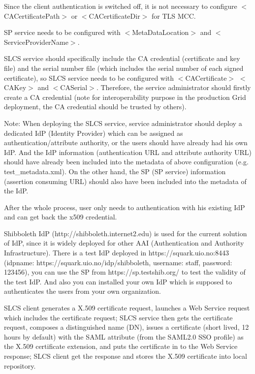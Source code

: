 \documentclass{article}                            %
\begin{document}
    Since the client authentication is switched off, it is not necessary to configure $<$CACertificatePath$>$ or $<$CACertificateDir$>$ for TLS MCC.

    SP service needs to be configured with $<$MetaDataLocation$>$ and $<$ServiceProviderName$>$.

    SLCS service should specifically include the CA credential (certificate and key file) and the serial number file (which includes the serial number of each signed certificate), so SLCS service needs to be configured with $<$CACertificate$>$ $<$CAKey$>$ and $<$CASerial$>$. Therefore, the service administrator should firstly create a CA credential (note for interoperability purpose in the production Grid deployment, the CA credential should be trusted by others).

Note: When deploying the SLCS service, service administrator should deploy a dedicated IdP (Identity Provider) which can be assigned as authentication/attribute authority, or the users should have already had his own IdP. And the IdP information (authentication URL and attribute authority URL) should have already been included into the metadata of above configuration (e.g. test\_metadata.xml). On the other hand, the SP (SP service) information (assertion consuming URL) should also have been included into the metadata of the IdP.

    After the whole process, user only needs to authentication with his existing IdP and can get back the x509 credential.

    Shibboleth IdP (http://shibboleth.internet2.edu) is used for the current solution of IdP, since it is widely deployed for other AAI (Authentication and Authority Infrastructure). There is a test IdP deployed in https://squark.uio.no:8443 (idpname: https://squark.uio.no/idp/shibboleth, username: staff, password: 123456), you can use the SP from https://sp.testshib.org/ to test the validity of the test IdP. And also you can installed your own IdP which is supposed to authenticates the users from your own organization.

    SLCS client generates  a X.509 certificate  request, launches a Web Service request which includes the certificate request; SLCS service then gets the certificate request, composes a distinguished name (DN), issues a certificate (short lived, 12 hours by default) with the SAML attribute (from the SAML2.0 SSO profile) as the X.509 certificate extension, and puts the certificate in to the Web Service response; SLCS client get the response and stores the X.509 certificate into local repository.
\end{document}
